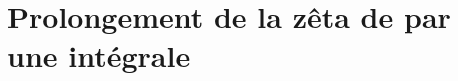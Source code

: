 \section{Prolongement de la zêta de  par une intégrale}

\begin{comment}
\subsection{Fonction Gamma d'\textsc{Euler}}\label{prolongementFonctionGamma}

On rappelle la définition de la fonction Gamma d'\textsc{Euler} (cf. \ref{secinteuleriennes}).
\begin{defi}[Fonction Gamma d'\textsc{Euler}]
    La \emph{fonction Gamma d'\textsc{Euler}} est définie par: 
    $$\Gamma(x) \defeq \int_{0}^{+\infty} t^{x-1} \e^{-t} \d t.$$
\end{defi}

\begin{prop}
    \begin{itemize}
        \item La fonction $\Gamma$ est définie si et seulement si $x>0$.
        \item Pour tout $x > 0$, $\Gamma(x+1) = x\Gamma(x)$. \\
        En particulier, pour tout $n \in \N$, $\Gamma(n+1) = n!$. 
    \end{itemize}
\end{prop}

\begin{demo}
    \begin{itemize}
        \item La fonction $f_x:t \mapsto t^{x-1} \e^{-t}$ est continue sur $]0, + \infty[$ comme produit de fonctions qui y sont continues. La fonction $f_x$ est donc intégrable sur tout segment de $]0, +\infty[$. Il reste à étudier son intégrabilité en $0$ et en $+ \infty$:
        \begin{itemize}
            \item[$\triangleright$] En $+\infty:$ par croissances comparées, $f_x(t) = o_{+\infty} \left(\frac{1}{t^2} \right)$. D'après le théorème de comparaison des fonctions à termes positifs, $f_x$ est intégrable au voisinage de $+\infty$.
            \item[$\triangleright$] En $0$: $f_x(t) \sim_0 t^{x-1}$ qui est intégrable d'après \textsc{Riemann} si et seulement si $1-x < 1$ i.e. si et seulement si $x > 0$.
        \end{itemize}


\end{comment}
